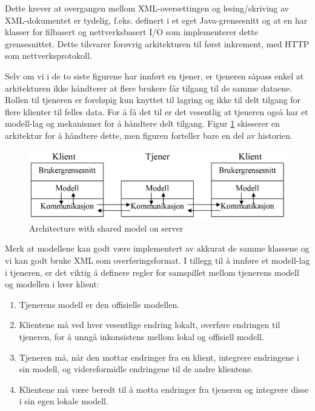 Dette krever at overgangen mellom XML-oversettingen og lesing/skriving av XML-dokumentet er tydelig, f.eks. definert i et eget Java-grensesnitt og at en har klasser for filbasert og nettverksbasert I/O som implementerer dette grensesnittet. Dette tilsvarer forøvrig arkitekturen til først inkrement, med HTTP som nettverksprotokoll.

Selv om vi i de to siste figurene har innført en tjener, er tjeneren såpass enkel at arkitekturen ikke håndterer at flere brukere får tilgang til de samme dataene. Rollen til tjeneren er foreløpig kun knyttet til lagring og ikke til delt tilgang for flere klienter til felles data. For å få det til er det vesentlig at tjeneren også har et modell-lag og mekanismer for å håndtere delt tilgang. Figur \ref{fig:split-server-model-architecture} skisserer en arkitektur for å håndtere dette, men figuren forteller bare en del av historien.

\begin{figure}[H]
    \centering
    \includegraphics[scale=0.35]{resources/split-server-model-architecture.PNG}
    \caption{Architecture with shared model on server}
    \label{fig:split-server-model-architecture}
\end{figure}

Merk at modellene kan godt være implementert av akkurat de samme klassene og vi kan godt bruke XML som overføringsformat. I tillegg til å innføre et modell-lag i tjeneren, er det viktig å definere regler for samspillet mellom tjenerens modell og modellen i hver klient:

\begin{enumerate}

\item
Tjenerens modell er den offisielle modellen.

\item
Klientene må ved hver vesentlige endring lokalt, overføre endringen til tjeneren, for å unngå inkonsistens mellom lokal og offisiell modell.

\item
Tjeneren må, når den mottar endringer fra en klient, integrere endringene i sin modell, og videreformidle endringene til de andre klientene.

\item
Klientene må være beredt til å motta endringer fra tjeneren og integrere disse i sin egen lokale modell.

\end{enumerate}

